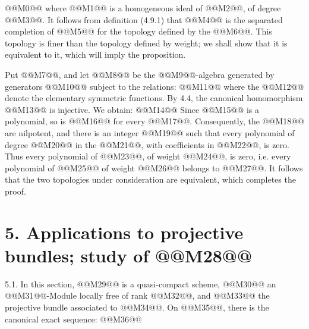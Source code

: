 @@M0@@
where @@M1@@ is a homogeneous ideal of @@M2@@, of degree @@M3@@. It follows from definition (4.9.1) that @@M4@@ is the separated completion of @@M5@@ for the topology defined by the @@M6@@. This topology is finer than the topology defined by weight; we shall show that it is equivalent to it, which will imply the proposition.

Put @@M7@@, and let @@M8@@ be the @@M9@@-algebra generated by generators @@M10@@ subject to the relations:
@@M11@@
where the @@M12@@ denote the elementary symmetric functions. By 4.4, the canonical homomorphism @@M13@@ is injective. We obtain:
@@M14@@
Since @@M15@@ is a polynomial, so is @@M16@@ for every @@M17@@. Consequently, the @@M18@@ are nilpotent, and there is an integer @@M19@@ such that every polynomial of degree @@M20@@ in the @@M21@@, with coefficients in @@M22@@, is zero. Thus every polynomial of @@M23@@, of weight @@M24@@, is zero, i.e. every polynomial of @@M25@@ of weight @@M26@@ belongs to @@M27@@. It follows that the two topologies under consideration are equivalent, which completes the proof.

\section*{5. Applications to projective bundles; study of \texorpdfstring{@@M28@@}{f*}}

5.1.
In this section, @@M29@@ is a quasi-compact scheme, @@M30@@ an @@M31@@-Module locally free of rank @@M32@@, and @@M33@@ the projective bundle associated to @@M34@@. On @@M35@@, there is the canonical exact sequence:
@@M36@@
